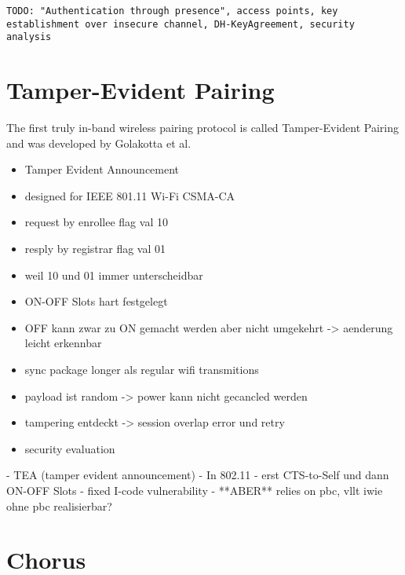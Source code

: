 \documentclass[conference]{IEEEtran}
\begin{document}
\texttt{TODO: "Authentication through presence", access points, key establishment over insecure channel, DH-KeyAgreement, security analysis}

\section{Tamper-Evident Pairing}

The first truly in-band wireless pairing protocol is called Tamper-Evident Pairing and was developed by Golakotta et al.
\begin{itemize}
    \item Tamper Evident Announcement
      \item designed for IEEE 801.11 Wi-Fi CSMA-CA
      \item request by enrollee flag val 10
      \item resply by registrar flag val 01
      \item weil 10 und 01 immer unterscheidbar
      \item ON-OFF Slots hart festgelegt
      \item OFF kann zwar zu ON gemacht werden aber nicht umgekehrt -> aenderung leicht erkennbar
      \item sync package longer als regular wifi transmitions 
      \item payload ist random -> power kann nicht gecancled werden 
      \item tampering entdeckt -> session overlap error und retry

    \item security evaluation 
\end{itemize}

  - TEA (tamper evident announcement)
  - In 802.11
      - erst CTS-to-Self und dann ON-OFF Slots
  - fixed I-code vulnerability
  - **ABER** relies on pbc, vllt iwie ohne pbc realisierbar?


\section{Chorus}
\end{document}
